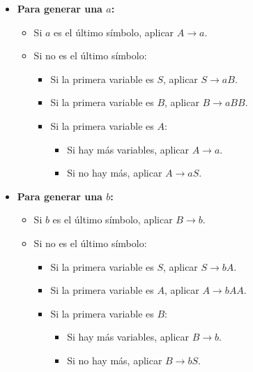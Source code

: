 \documentclass[12pt]{report} %
\providecommand{\tightlist}{%
  \setlength{\itemsep}{0pt}\setlength{\parskip}{0pt}}
\begin{document}
\begin{itemize}
\tightlist
\item
  \textbf{Para generar una \(a\):}

  \begin{itemize}
  \tightlist
  \item
    Si \(a\) es el último símbolo, aplicar \(A \to a\).\\
  \item
    Si no es el último símbolo:

    \begin{itemize}
    \tightlist
    \item
      Si la primera variable es \(S\), aplicar \(S \to aB\).\\
    \item
      Si la primera variable es \(B\), aplicar \(B \to aBB\).\\
    \item
      Si la primera variable es \(A\):

      \begin{itemize}
      \tightlist
      \item
        Si hay más variables, aplicar \(A \to a\).\\
      \item
        Si no hay más, aplicar \(A \to aS\).
      \end{itemize}
    \end{itemize}
  \end{itemize}
\item
  \textbf{Para generar una \(b\):}

  \begin{itemize}
  \tightlist
  \item
    Si \(b\) es el último símbolo, aplicar \(B \to b\).\\
  \item
    Si no es el último símbolo:

    \begin{itemize}
    \tightlist
    \item
      Si la primera variable es \(S\), aplicar \(S \to bA\).\\
    \item
      Si la primera variable es \(A\), aplicar \(A \to bAA\).\\
    \item
      Si la primera variable es \(B\):

      \begin{itemize}
      \tightlist
      \item
        Si hay más variables, aplicar \(B \to b\).\\
      \item
        Si no hay más, aplicar \(B \to bS\).
      \end{itemize}
    \end{itemize}
  \end{itemize}
\end{itemize}
\end{document}
